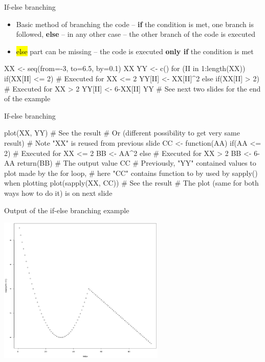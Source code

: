 \documentclass[compress, ucs, xelatex, 11pt, xcolor=svgnames,
  hyperref={
    bookmarks=true,
    unicode=true,
    colorlinks=true,
    pdftitle={Molecular data in R},
    plainpages=false,
    pdfauthor={Vojtech Zeisek},
    pdfsubject={Course about phylogeny and evolution in R},
    pdfcreator={XeLaTeX},
    pdfkeywords={R, evolution, phylogeny, molecular data},
    linkcolor=Tomato,
    anchorcolor=SaddleBrown,
    citecolor=Goldenrod,
    filecolor=DarkMagenta,
    menucolor=Sienna,
    urlcolor=DarkTurquoise,
    pdftex},
  url={hyphens, lowtilde} %
  ]{beamer}
\renewcommand{\texttt}[1]{\hl{\ttfamily #1}}
\begin{document}
\begin{frame}[fragile]{If-else branching}
  \begin{itemize}
    \item Basic method of branching the code -- \textbf{if} the condition is met, one branch is followed, \textbf{else} -- in any other case -- the other branch of the code is executed
    \item \texttt{else} part can be missing -- the code is executed \textbf{only if} the condition is met
  \end{itemize}
  \begin{spluscode}
    XX <- seq(from=-3, to=6.5, by=0.1)
    XX
    YY <- c()
    for (II in 1:length(XX)) {
      if(XX[II] <= 2) { # Executed for XX <= 2
        YY[II] <- XX[II]^2
        } else if(XX[II] > 2) { # Executed for XX > 2
          YY[II] <- 6-XX[II]
          }
      }
    YY # See next two slides for the end of the example
  \end{spluscode}
\end{frame}

\begin{frame}[fragile]{If-else branching}
  \begin{spluscode}
    plot(XX, YY) # See the result
    # Or (different possibility to get very same result)
    # Note "XX" is reused from previous slide
    CC <- function(AA) {
      if(AA <= 2) { # Executed for XX <= 2
        BB <- AA^2
      } else { # Executed for XX > 2
        BB <- 6-AA
        }
      return(BB) # The output value
      }
     CC # Previously, "YY" contained values to plot made by the for loop,
        # here "CC" contains function to by used by sapply() when plotting
     plot(sapply(XX, CC)) # See the result
    # The plot (same for both ways how to do it) is on next slide
  \end{spluscode}
\end{frame}

\begin{frame}{Output of the if-else branching example}
  \begin{center}
    \includegraphics[height=7cm]{if-else.png}
  \end{center}
\end{frame}
\end{document}
